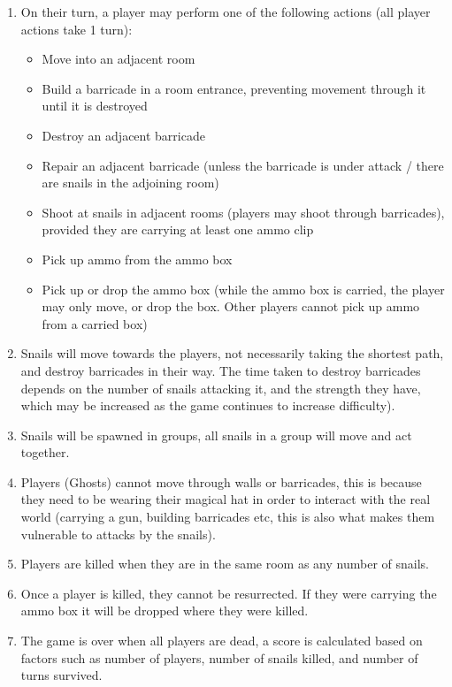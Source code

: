 \documentclass[a4wide, 11pt]{article}
\begin{document}
\begin{enumerate}
	\item On their turn, a player may perform one of the following actions (all player actions take 1 turn):
		\begin{itemize}
			\item Move into an adjacent room
			\item Build a barricade in a room entrance, preventing movement through it until it is destroyed
			\item Destroy an adjacent barricade
			\item Repair an adjacent barricade (unless the barricade is under attack / there are snails in the adjoining room)
			\item Shoot at snails in adjacent rooms (players may shoot through barricades), provided they are carrying at least one ammo clip
			\item Pick up ammo from the ammo box
			\item Pick up or drop the ammo box (while the ammo box is carried, the player may only move, or drop the box. Other players cannot pick up ammo from a carried box)
		\end{itemize}
	\item Snails will move towards the players, not necessarily taking the shortest path, and destroy barricades in their way. The time taken to destroy barricades depends on the number of snails attacking it, and the strength they have, which may be increased as the game continues to increase difficulty).
	\item Snails will be spawned in groups, all snails in a group will move and act together.
	\item Players (Ghosts) cannot move through walls or barricades, this is because they need to be wearing their magical hat in order to interact with the real world (carrying a gun, building barricades etc, this is also what makes them vulnerable to attacks by the snails).
	\item Players are killed when they are in the same room as any number of snails.
	\item Once a player is killed, they cannot be resurrected. If they were carrying the ammo box it will be dropped where they were killed.
	\item The game is over when all players are dead, a score is calculated based on factors such as number of players, number of snails killed, and number of turns survived.
\end{enumerate}
\end{document}

